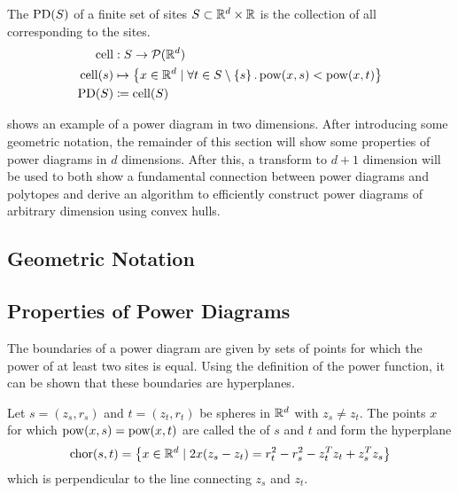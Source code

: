 \begin{definition}
    \label{def:powerdiagram}
    The  $\operatorname{PD}(S)$ of a finite set of sites $S \subset \mathbb{R}^d \times \mathbb{R}$ is the collection of all  corresponding to the sites.
    \begin{align}
        \operatorname{cell} &: S \to \mathcal{P}(\mathbb{R}^d)\\
        \operatorname{cell}(s) &\mapsto \left\{ x \in \mathbb{R}^d \mid \forall t \in S \setminus \left\{ s \right\}. \operatorname{pow}(x, s) < \operatorname{pow}(x, t) \right\}\\
        \operatorname{PD}(S) &\coloneqq \operatorname{cell}(S)
    \end{align}
\end{definition}

 shows an example of a power diagram in two dimensions.
After introducing some geometric notation, the remainder of this section will show some properties of power diagrams in $d$ dimensions.
After this, a transform to $d + 1$ dimension will be used to both show a fundamental connection between power diagrams and polytopes and derive an algorithm to efficiently construct power diagrams of arbitrary dimension using convex hulls.

\subsection{Geometric Notation}
\label{sub:geometric_notation}

\subsection{Properties of Power Diagrams}
\label{sub:properties_of_power_diagrams}
The boundaries of a power diagram are given by sets of points for which the power of at least two sites is equal.
Using the definition of the power function, it can be shown that these boundaries are hyperplanes.
\begin{observation}
    \label{obs:chordale}
    Let $s = (z_s, r_s)$ and $t = (z_t, r_t)$ be spheres in $\mathbb{R}^d$ with $z_s \neq z_t$. The points $x$ for which $\operatorname{pow}(x, s) = \operatorname{pow}(x, t)$ are called the  of $s$ and $t$ and form the hyperplane
    \begin{align}
        \operatorname{chor}(s, t) = \left\{ x \in \mathbb{R}^d \mid 2x(z_s - z_t) = r_t^2 - r_s^2 - z_t^Tz_t + z_s^Tz_s \right\}
    \end{align}
    which is perpendicular to the line connecting $z_s$ and $z_t$.
\end{observation}

